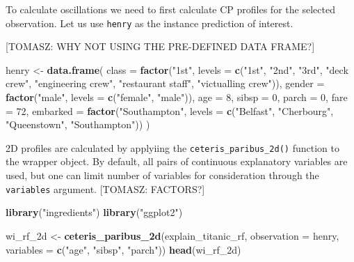 \documentclass[12pt,]{krantz}
\newenvironment{Shaded}{\begin{snugshade}}{\end{snugshade}}
\newcommand{\DataTypeTok}[1]{\textcolor[rgb]{0.13,0.29,0.53}{#1}}
\newcommand{\DecValTok}[1]{\textcolor[rgb]{0.00,0.00,0.81}{#1}}
\newcommand{\KeywordTok}[1]{\textcolor[rgb]{0.13,0.29,0.53}{\textbf{#1}}}
\newcommand{\NormalTok}[1]{#1}
\newcommand{\StringTok}[1]{\textcolor[rgb]{0.31,0.60,0.02}{#1}}
\begin{document}
To calculate oscillations we need to first calculate CP profiles for the selected observation. Let us use \texttt{henry} as the instance prediction of interest.

{[}TOMASZ: WHY NOT USING THE PRE-DEFINED DATA FRAME?{]}

\begin{Shaded}
\begin{Highlighting}[]
\NormalTok{henry <-}\StringTok{ }\KeywordTok{data.frame}\NormalTok{(}
  \DataTypeTok{class =} \KeywordTok{factor}\NormalTok{(}\StringTok{"1st"}\NormalTok{, }\DataTypeTok{levels =} \KeywordTok{c}\NormalTok{(}\StringTok{"1st"}\NormalTok{, }\StringTok{"2nd"}\NormalTok{, }\StringTok{"3rd"}\NormalTok{, }\StringTok{"deck crew"}\NormalTok{, }\StringTok{"engineering crew"}\NormalTok{, }
                                  \StringTok{"restaurant staff"}\NormalTok{, }\StringTok{"victualling crew"}\NormalTok{)),}
  \DataTypeTok{gender =} \KeywordTok{factor}\NormalTok{(}\StringTok{"male"}\NormalTok{, }\DataTypeTok{levels =} \KeywordTok{c}\NormalTok{(}\StringTok{"female"}\NormalTok{, }\StringTok{"male"}\NormalTok{)),}
  \DataTypeTok{age =} \DecValTok{8}\NormalTok{,}
  \DataTypeTok{sibsp =} \DecValTok{0}\NormalTok{,}
  \DataTypeTok{parch =} \DecValTok{0}\NormalTok{,}
  \DataTypeTok{fare =} \DecValTok{72}\NormalTok{,}
  \DataTypeTok{embarked =} \KeywordTok{factor}\NormalTok{(}\StringTok{"Southampton"}\NormalTok{, }\DataTypeTok{levels =} \KeywordTok{c}\NormalTok{(}\StringTok{"Belfast"}\NormalTok{, }\StringTok{"Cherbourg"}\NormalTok{, }\StringTok{"Queenstown"}\NormalTok{, }\StringTok{"Southampton"}\NormalTok{))}
\NormalTok{)}
\end{Highlighting}
\end{Shaded}

2D profiles are calculated by applyiing the \texttt{ceteris\_paribus\_2d()} function to the wrapper object. By default, all pairs of continuous explanatory variables are used, but one can limit number of variables for consideration through the \texttt{variables} argument. {[}TOMASZ: FACTORS?{]}

\begin{Shaded}
\begin{Highlighting}[]
\KeywordTok{library}\NormalTok{(}\StringTok{"ingredients"}\NormalTok{)}
\KeywordTok{library}\NormalTok{(}\StringTok{"ggplot2"}\NormalTok{)}

\NormalTok{wi_rf_2d <-}\StringTok{ }\KeywordTok{ceteris_paribus_2d}\NormalTok{(explain_titanic_rf, }\DataTypeTok{observation =}\NormalTok{ henry, }\DataTypeTok{variables =} \KeywordTok{c}\NormalTok{(}\StringTok{"age"}\NormalTok{, }\StringTok{"sibsp"}\NormalTok{, }\StringTok{"parch"}\NormalTok{))}
\KeywordTok{head}\NormalTok{(wi_rf_2d)}
\end{Highlighting}
\end{Shaded}
\end{document}
